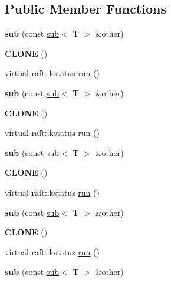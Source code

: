 \subsection*{Public Member Functions}
\begin{DoxyCompactItemize}
\item 
\hypertarget{classsub_a4ac64767baaddc87027b262dac5528e0}{}\label{classsub_a4ac64767baaddc87027b262dac5528e0} 
{\bfseries sub} (const \hyperlink{classsub}{sub}$<$ T $>$ \&other)
\item 
\hypertarget{classsub_ae51496c5801b301aa89045d58c7d5f24}{}\label{classsub_ae51496c5801b301aa89045d58c7d5f24} 
{\bfseries C\+L\+O\+NE} ()
\item 
virtual raft\+::kstatus \hyperlink{classsub_a0a0c7461433ee8b5f4b24305282bf69a}{run} ()
\item 
\hypertarget{classsub_a4ac64767baaddc87027b262dac5528e0}{}\label{classsub_a4ac64767baaddc87027b262dac5528e0} 
{\bfseries sub} (const \hyperlink{classsub}{sub}$<$ T $>$ \&other)
\item 
\hypertarget{classsub_ae51496c5801b301aa89045d58c7d5f24}{}\label{classsub_ae51496c5801b301aa89045d58c7d5f24} 
{\bfseries C\+L\+O\+NE} ()
\item 
virtual raft\+::kstatus \hyperlink{classsub_a0a0c7461433ee8b5f4b24305282bf69a}{run} ()
\item 
\hypertarget{classsub_a4ac64767baaddc87027b262dac5528e0}{}\label{classsub_a4ac64767baaddc87027b262dac5528e0} 
{\bfseries sub} (const \hyperlink{classsub}{sub}$<$ T $>$ \&other)
\item 
\hypertarget{classsub_ae51496c5801b301aa89045d58c7d5f24}{}\label{classsub_ae51496c5801b301aa89045d58c7d5f24} 
{\bfseries C\+L\+O\+NE} ()
\item 
virtual raft\+::kstatus \hyperlink{classsub_a0a0c7461433ee8b5f4b24305282bf69a}{run} ()
\item 
\hypertarget{classsub_a4ac64767baaddc87027b262dac5528e0}{}\label{classsub_a4ac64767baaddc87027b262dac5528e0} 
{\bfseries sub} (const \hyperlink{classsub}{sub}$<$ T $>$ \&other)
\item 
\hypertarget{classsub_ae51496c5801b301aa89045d58c7d5f24}{}\label{classsub_ae51496c5801b301aa89045d58c7d5f24} 
{\bfseries C\+L\+O\+NE} ()
\item 
virtual raft\+::kstatus \hyperlink{classsub_a0a0c7461433ee8b5f4b24305282bf69a}{run} ()
\item 
\hypertarget{classsub_a4ac64767baaddc87027b262dac5528e0}{}\label{classsub_a4ac64767baaddc87027b262dac5528e0} 
{\bfseries sub} (const \hyperlink{classsub}{sub}$<$ T $>$ \&other)

\end{DoxyCompactItemize}
